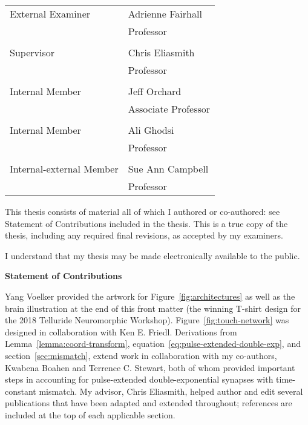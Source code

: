 \noindent\begin{tabular}{@{}ll}\\
    External Examiner & Adrienne Fairhall \\ & Professor \\ \\
    Supervisor & Chris Eliasmith \\ & Professor \\ \\
    Internal Member & Jeff Orchard \\ & Associate Professor \\ \\
    Internal Member & Ali Ghodsi \\ & Professor \\ \\
    Internal-external Member & Sue Ann Campbell \\ & Professor
\end{tabular}

\cleardoublepage
{}
{}

\noindent
This thesis consists of material all of which I authored or co-authored: see Statement of Contributions included in the thesis. This is a true copy of the thesis, including any required final revisions, as accepted by my examiners.

\bigskip

\noindent
I understand that my thesis may be made electronically available to
the public.

\cleardoublepage

{}
\begin{center}\textbf{Statement of Contributions}\end{center}

\noindent
Yang Voelker provided the artwork for Figure~\ref{fig:architectures} as well as the brain illustration at the end of this front matter (the winning T-shirt design for the 2018 Telluride Neuromorphic Workshop).
Figure~\ref{fig:touch-network} was designed in collaboration with Ken E. Friedl.
Derivations from Lemma~\ref{lemma:coord-transform}, equation~\ref{eq:pulse-extended-double-exp}, and section~\ref{sec:mismatch}, extend work in collaboration with my co-authors, Kwabena Boahen and Terrence C. Stewart, both of whom provided important steps in accounting for pulse-extended double-exponential synapses with time-constant mismatch.
My advisor, Chris Eliasmith, helped author and edit several publications that have been adapted and extended throughout; references are included at the top of each applicable section.

\cleardoublepage

